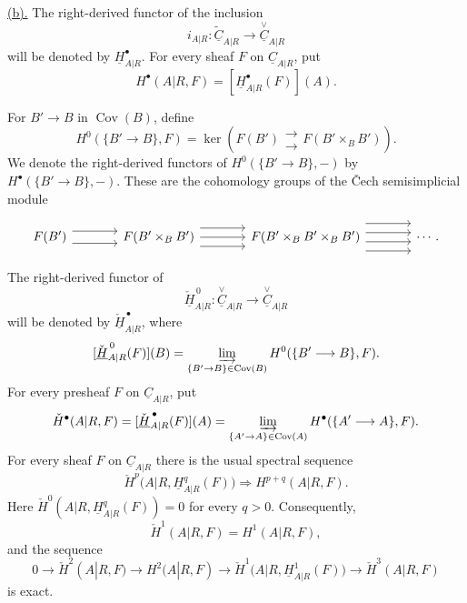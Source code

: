 \underline{(b).} The right-derived functor of the inclusion
\[
 i_{A|R}:\widetilde{\underline C}_{A|R}
 \longrightarrow\overset{\vee}{\underline C}_{A|R}
\]
will be denoted by $\underline H^{\bullet}_{A|R}$. For every sheaf
$F$ on $\underline C_{A|R}$, put
\[
 H^{\bullet}(A|R,F)=
 [\underline H^{\bullet}_{A|R}(F)](A).
\]

For $B'\longrightarrow B$ in $\operatorname{Cov}(B)$, define
\[
 H^0(\{B'\longrightarrow B\},F)=
 \ker\!\left(
 F(B')\mathrel{\substack{\longrightarrow\\[-.6ex]\longrightarrow}}
 F(B'\mathbin{\times_B}B')
 \right).
\]
We denote the right-derived functors of
$H^0(\{B'\longrightarrow B\},-)$ by
$H^{\bullet}(\{B'\longrightarrow B\},-)$. These are the cohomology
groups of the \v{C}ech semisimplicial module


\[
\begin{tikzcd}[column sep=large]
 F(B')
   \arrow[r,shift left=2] \arrow[r,shift right=2]
 & F(B'\times_BB')
   \arrow[r,shift left=3] \arrow[r] \arrow[r,shift right=3]
 & F(B'\times_BB'\times_BB')
   \arrow[r,shift left=4.5] \arrow[r,shift left=1.5]
   \arrow[r,shift right=1.5] \arrow[r,shift right=4.5]
 & \cdots .
\end{tikzcd}
\]

The right-derived functor of
\[
 \check{\underline H}^{\,0}_{A|R}:
 \overset{\vee}{\underline C}_{A|R}
 \longrightarrow\overset{\vee}{\underline C}_{A|R}
\]
will be denoted by $\check{\underline H}^{\,\bullet}_{A|R}$, where
\[
 [\check{\underline H}^{\,0}_{A|R}(F)](B)=
 \varinjlim_{\{B'\to B\}\in\operatorname{Cov}(B)}
 H^0(\{B'\longrightarrow B\},F).
\]
For every presheaf $F$ on $\underline C_{A|R}$, put
\[
 \check H^{\bullet}(A|R,F)=
 [\check{\underline H}^{\,\bullet}_{A|R}(F)](A)=
 \varinjlim_{\{A'\to A\}\in\operatorname{Cov}(A)}
 H^{\bullet}(\{A'\longrightarrow A\},F).
\]
For every sheaf $F$ on $\underline C_{A|R}$ there is the usual
spectral sequence
\[
 \check H^p\bigl(A|R,\underline H^q_{A|R}(F)\bigr)
 \Longrightarrow H^{p+q}(A|R,F).
\]
Here
$\check H^0(A|R,\underline H^q_{A|R}(F))=0$ for every $q>0$.
Consequently,
\[
 \check H^1(A|R,F)=H^1(A|R,F),
\]
and the sequence
\[
 0\longrightarrow\check H^2(A|R,F)
 \longrightarrow H^2(A|R,F)
 \longrightarrow
 \check H^1\bigl(A|R,\underline H^1_{A|R}(F)\bigr)
 \longrightarrow\check H^3(A|R,F)
\]
is exact.

